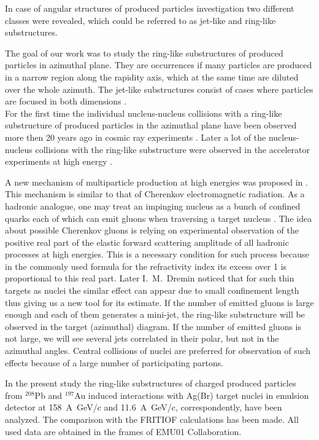 \documentclass[12pt]{article}
\begin{document}
In case of angular structures of produced particles investigation two different classes were revealed, which could be referred to as jet-like and ring-like substructures.

The goal of our work was to study the ring-like substructures of produced particles in azimuthal plane. They are occurrences if many particles are produced in a narrow region along the rapidity axis, which at the same time are diluted over the whole azimuth. The jet-like substructures consist of cases where particles are focused in both dimensions \cite{bib04}. \\


For the first time the individual nucleus-nucleus collisions with a ring-like substructure of produced particles in the azimuthal plane have been observed more then 20 years ago in cosmic ray experiments \cite{bib05}. Later a lot of the nucleus-nucleus collisions with the ring-like substructure were observed in the accelerator experiments at high energy \cite{bib03,bib06,bib07,bib08,bib19,bib20}.

A new mechanism of multiparticle production at high energies was proposed in \cite{bib09,bib10,bib11}. This mechanism is similar to that of Cherenkov electromagnetic radiation. As a hadronic analogue, one may treat an impinging nucleus as a bunch of confined quarks each of which can emit gluons when traversing a target nucleus \cite{bib12,bib13}. The idea about possible Cherenkov gluons is relying \cite{bib09} on experimental observation of the positive real part of the elastic forward scattering amplitude of all hadronic processes at high energies. This is a necessary condition for such process because in the commonly used formula for the refractivity index its excess over 1 is proportional to this real part. Later I.~M.~Dremin \cite{bib10} noticed that for such thin targets as nuclei the similar effect can appear due to small confinement length thus giving us a new tool for its estimate. If the number of emitted gluons is large enough and each of them generates a mini-jet, the ring-like substructure will be observed in the target (azimuthal) diagram. If the number of emitted gluons is not large, we will see several jets correlated in their polar, but not in the azimuthal angles. Central collisions of nuclei are preferred for observation of such effects because of a large number of participating partons.

In the present study the ring-like substructures of charged produced particles from ${}^{208}$Pb and ${}^{197}$Au induced interactions with Ag(Br) target nuclei in emulsion detector at 158~A~GeV/c and 11.6~A~GeV/c, correspondently, have been analyzed. The comparison with the FRITIOF calculations \cite{bib14} has been made. All used data are obtained in the frames of EMU01 Collaboration.
\end{document}
